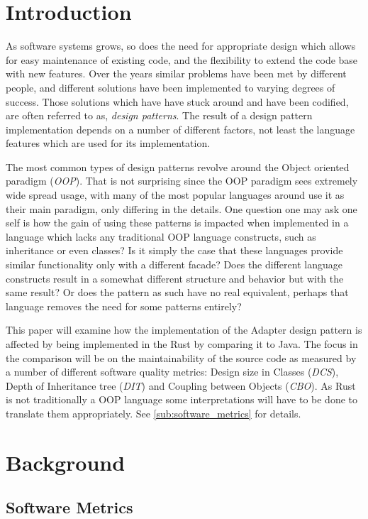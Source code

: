 \documentclass[conference]{IEEEtran}
\begin{document}
\section{Introduction}
As software systems grows, so does the need for appropriate design which allows for easy maintenance of existing code, and the flexibility to extend the code base with new features.
Over the years similar problems have been met by different people, and different solutions have been implemented to varying degrees of success.
Those solutions which have have stuck around and have been codified, are often referred to as, \emph{design patterns}.
The result of a design pattern implementation depends on a number of different factors, not least the language features which are used for its implementation.

The most common types of design patterns revolve around the Object oriented paradigm (\emph{OOP}).
That is not surprising since the OOP paradigm sees extremely wide spread usage, with many of the most popular languages around use it as their main paradigm, only differing in the details.
One question one may ask one self is how the gain of using these patterns is impacted when implemented in a language which lacks any traditional OOP language constructs, such as inheritance or even classes?
Is it simply the case that these languages provide similar functionality only with a different facade?
Does the different language constructs result in a somewhat different structure and behavior but with the same result?
Or does the pattern as such have no real equivalent, perhaps that language removes the need for some patterns entirely?

This paper will examine how the implementation of the Adapter design pattern is affected by being implemented in the Rust by comparing it to Java.
The focus in the comparison will be on the maintainability of the source code as measured by a number of different software quality metrics: Design size in Classes (\emph{DCS}), Depth of Inheritance tree (\emph{DIT}) and Coupling between Objects (\emph{CBO}). 
As Rust is not traditionally a OOP language some interpretations will have to be done to translate them appropriately. 
See \autoref{sub:software_metrics} for details.

\section{Background}

\subsection{Software Metrics}
\label{sub:software_metrics}
\end{document}
